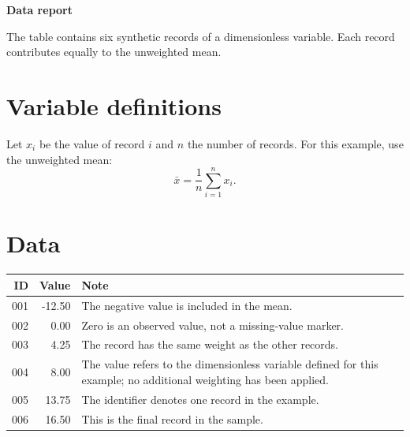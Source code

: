 \def\lakitlanguageprofile{english}
\def\lakitmainlanguage{english}
\def\lakitdocumentclass{article}
\def\lakitclassoptions{11pt,a4paper}
\def\lakitgeometryoptions{margin=2.2cm,headheight=14pt}
\def\lakitlinespread{1.18}
\def\lakitparagraphstyle{block}





{\LARGE\sffamily\bfseries\noindent Data report\par}\medskip
The table contains six synthetic records of a dimensionless variable. Each record
contributes equally to the unweighted mean.
\section{Variable definitions}
Let $x_i$ be the value of record $i$ and $n$ the number of records.
For this example, use the unweighted mean:
\begin{equation}\label{eq:mean}
\bar{x}=\frac{1}{n}\sum_{i=1}^{n}x_i.
\end{equation}
\section{Data}
\begin{center}
\begin{tabular}{@{}rr>{\raggedright\arraybackslash}p{9cm}@{}}
\toprule
\textbf{ID} & \textbf{Value} & \textbf{Note}\\
\midrule
001 & -12.50 & The negative value is included in the mean.\\
002 & 0.00 & Zero is an observed value, not a missing-value marker.\\
003 & 4.25 & The record has the same weight as the other records.\\
004 & 8.00 & The value refers to the dimensionless variable defined for this example; no additional weighting has been applied.\\
005 & 13.75 & The identifier denotes one record in the example.\\
006 & 16.50 & This is the final record in the sample.\\
\bottomrule
\end{tabular}
\end{center}
